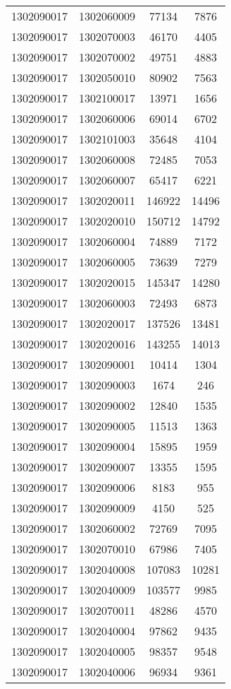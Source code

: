 \begin{longtable}{llcc}
1302090017 & 1302060009 & 77134 & 7876\\
1302090017 & 1302070003 & 46170 & 4405\\
1302090017 & 1302070002 & 49751 & 4883\\
1302090017 & 1302050010 & 80902 & 7563\\
1302090017 & 1302100017 & 13971 & 1656\\
1302090017 & 1302060006 & 69014 & 6702\\
1302090017 & 1302101003 & 35648 & 4104\\
1302090017 & 1302060008 & 72485 & 7053\\
1302090017 & 1302060007 & 65417 & 6221\\
1302090017 & 1302020011 & 146922 & 14496\\
1302090017 & 1302020010 & 150712 & 14792\\
1302090017 & 1302060004 & 74889 & 7172\\
1302090017 & 1302060005 & 73639 & 7279\\
1302090017 & 1302020015 & 145347 & 14280\\
1302090017 & 1302060003 & 72493 & 6873\\
1302090017 & 1302020017 & 137526 & 13481\\
1302090017 & 1302020016 & 143255 & 14013\\
1302090017 & 1302090001 & 10414 & 1304\\
1302090017 & 1302090003 & 1674 & 246\\
1302090017 & 1302090002 & 12840 & 1535\\
1302090017 & 1302090005 & 11513 & 1363\\
1302090017 & 1302090004 & 15895 & 1959\\
1302090017 & 1302090007 & 13355 & 1595\\
1302090017 & 1302090006 & 8183 & 955\\
1302090017 & 1302090009 & 4150 & 525\\
1302090017 & 1302060002 & 72769 & 7095\\
1302090017 & 1302070010 & 67986 & 7405\\
1302090017 & 1302040008 & 107083 & 10281\\
1302090017 & 1302040009 & 103577 & 9985\\
1302090017 & 1302070011 & 48286 & 4570\\
1302090017 & 1302040004 & 97862 & 9435\\
1302090017 & 1302040005 & 98357 & 9548\\
1302090017 & 1302040006 & 96934 & 9361\\

\end{longtable}
